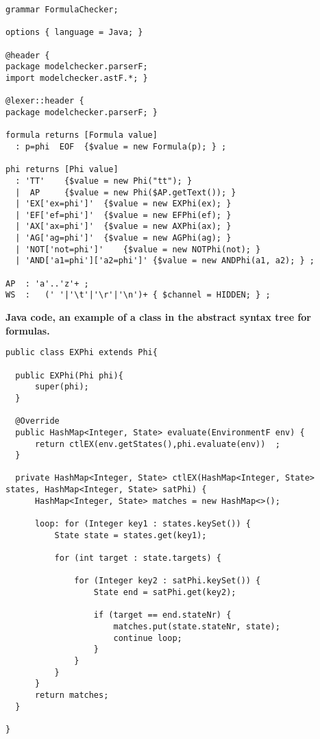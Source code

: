 \begin{lstlisting}
grammar FormulaChecker;

options { language = Java; }

@header {
package modelchecker.parserF;
import modelchecker.astF.*; }

@lexer::header {
package modelchecker.parserF; }

formula returns [Formula value]
  : p=phi  EOF  {$value = new Formula(p); } ;

phi returns [Phi value]
  : 'TT' 	{$value = new Phi("tt"); }
  |  AP 	{$value = new Phi($AP.getText()); }
  | 'EX['ex=phi']' 	{$value = new EXPhi(ex); }
  | 'EF['ef=phi']' 	{$value = new EFPhi(ef); }
  | 'AX['ax=phi']' 	{$value = new AXPhi(ax); }
  | 'AG['ag=phi']' 	{$value = new AGPhi(ag); }
  | 'NOT['not=phi']' 	{$value = new NOTPhi(not); }
  | 'AND['a1=phi']['a2=phi']' {$value = new ANDPhi(a1, a2); } ;

AP  : 'a'..'z'+ ;
WS  :   (' '|'\t'|'\r'|'\n')+ { $channel = HIDDEN; } ; 

\end{lstlisting}

\newpage

\begin{center}
\textbf{Java code, an example of a class in the abstract syntax tree for formulas.}
\end{center}

\begin{lstlisting}
public class EXPhi extends Phi{

  public EXPhi(Phi phi){
      super(phi);
  }

  @Override
  public HashMap<Integer, State> evaluate(EnvironmentF env) {
      return ctlEX(env.getStates(),phi.evaluate(env))  ;
  }

  private HashMap<Integer, State> ctlEX(HashMap<Integer, State> states, HashMap<Integer, State> satPhi) {
      HashMap<Integer, State> matches = new HashMap<>();
  
      loop: for (Integer key1 : states.keySet()) {
          State state = states.get(key1);

          for (int target : state.targets) {

              for (Integer key2 : satPhi.keySet()) {
                  State end = satPhi.get(key2);

                  if (target == end.stateNr) {
                      matches.put(state.stateNr, state);
                      continue loop;
                  }
              }
          }
      }
      return matches;
  }

}
\end{lstlisting}